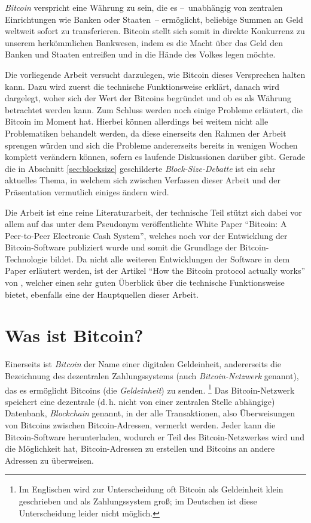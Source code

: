 \emph{Bitcoin} verspricht eine Währung zu sein, die es --~unabhängig von zentralen Einrichtungen wie Banken oder Staaten~-- ermöglicht, beliebige Summen an Geld weltweit sofort zu transferieren.
Bitcoin stellt sich somit in direkte Konkurrenz zu unserem herkömmlichen Bankwesen, indem es die Macht über das Geld den Banken und Staaten entreißen und in die Hände des Volkes legen möchte.

Die vorliegende Arbeit versucht darzulegen, wie Bitcoin dieses Versprechen halten kann.
Dazu wird zuerst die technische Funktionsweise erklärt, danach wird dargelegt, woher sich der Wert der Bitcoins begründet und ob es als Währung betrachtet werden kann.
Zum Schluss werden noch einige Probleme erläutert, die Bitcoin im Moment hat.
Hierbei können allerdings bei weitem nicht alle Problematiken behandelt werden, da diese einerseits den Rahmen der Arbeit sprengen würden und sich die Probleme andererseits bereits in wenigen Wochen komplett verändern können, sofern es laufende Diskussionen darüber gibt.
Gerade die in Abschnitt \ref{sec:blocksize} geschilderte \emph{Block-Size-Debatte} ist ein sehr aktuelles Thema, in welchem sich zwischen Verfassen dieser Arbeit und der Präsentation vermutlich einiges ändern wird.

Die Arbeit ist eine reine Literaturarbeit, der technische Teil stützt sich dabei vor allem auf das unter dem Pseudonym  veröffentlichte White Paper "`Bitcoin: A Peer-to-Peer Electronic Cash System"', welches noch vor der Entwicklung der Bitcoin-Software publiziert wurde und somit die Grundlage der Bitcoin-Technologie bildet. \parencite{nakamoto}
Da nicht alle weiteren Entwicklungen der Software in dem Paper erläutert werden, ist der Artikel "`How the Bitcoin protocol actually works"' von , welcher einen sehr guten Überblick über die technische Funktionsweise bietet, ebenfalls eine der Hauptquellen dieser Arbeit. \parencite{nielsen}

\section{Was ist Bitcoin?}
\label{sec:bitcoinintro}

Einerseits ist \emph{Bitcoin} der Name einer digitalen Geldeinheit, andererseits die Bezeichnung des dezentralen Zahlungssystems (auch \emph{Bitcoin-Netzwerk} genannt), das es ermöglicht Bitcoins (die \emph{Geldeinheit}) zu senden.%
\footnote{Im Englischen wird zur Unterscheidung oft Bitcoin als Geldeinheit klein geschrieben und als Zahlungssystem groß; im Deutschen ist diese Unterscheidung leider nicht möglich.}
Das Bitcoin-Netzwerk speichert eine dezentrale (d.\,h. nicht von einer zentralen Stelle abhängige) Datenbank, \emph{Blockchain} genannt, in der alle Transaktionen, also Überweisungen von Bitcoins zwischen Bitcoin-Adressen, vermerkt werden.
Jeder kann die Bitcoin-Software herunterladen, wodurch er Teil des Bitcoin-Netzwerkes wird und die Möglichkeit hat, Bitcoin-Adressen zu erstellen und Bitcoins an andere Adressen zu überweisen.

